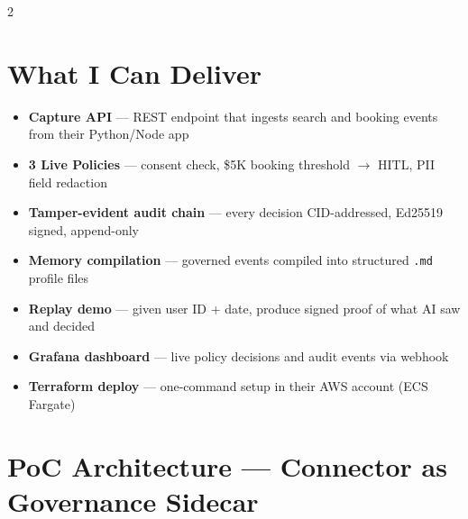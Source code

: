 \documentclass[10pt, a4paper]{article}
\begin{document}
\begin{multicols}{2}
\vspace{4pt}
\section{What I Can Deliver}

\begin{itemize}[leftmargin=*, itemsep=1pt, topsep=2pt, label=\textcolor{cgreen}{\small$\checkmark$}]
  \item \textbf{Capture API} --- REST endpoint that ingests search and booking events from their Python/Node app
  \item \textbf{3 Live Policies} --- consent check, \$5K booking threshold $\to$ HITL, PII field redaction
  \item \textbf{Tamper-evident audit chain} --- every decision CID-addressed, Ed25519 signed, append-only
  \item \textbf{Memory compilation} --- governed events compiled into structured \texttt{.md} profile files
  \item \textbf{Replay demo} --- given user ID + date, produce signed proof of what AI saw and decided
  \item \textbf{Grafana dashboard} --- live policy decisions and audit events via webhook
  \item \textbf{Terraform deploy} --- one-command setup in their AWS account (ECS Fargate)
\end{itemize}

\end{multicols}

\vspace{4pt}
\section{PoC Architecture --- Connector as Governance Sidecar}
\vspace{6pt}
\end{document}
